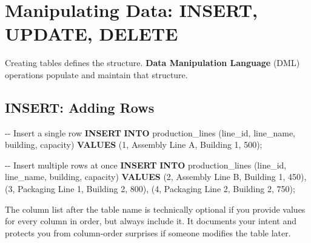 \documentclass[
  letterpaper,
  DIV=11,
  numbers=noendperiod]{scrreprt}
\newenvironment{Shaded}{\begin{snugshade}}{\end{snugshade}}
\newcommand{\CommentTok}[1]{\textcolor[rgb]{0.37,0.37,0.37}{#1}}
\newcommand{\DecValTok}[1]{\textcolor[rgb]{0.68,0.00,0.00}{#1}}
\newcommand{\KeywordTok}[1]{\textcolor[rgb]{0.00,0.23,0.31}{\textbf{#1}}}
\newcommand{\NormalTok}[1]{\textcolor[rgb]{0.00,0.23,0.31}{#1}}
\newcommand{\StringTok}[1]{\textcolor[rgb]{0.13,0.47,0.30}{#1}}
\begin{document}
\section{Manipulating Data: INSERT, UPDATE,
DELETE}\label{manipulating-data-insert-update-delete}

Creating tables defines the structure. \textbf{Data Manipulation
Language} (DML) operations populate and maintain that structure.

\subsection{INSERT: Adding Rows}\label{insert-adding-rows}

\begin{codelisting}

\caption{\texttt{duckdb}}

\begin{Shaded}
\begin{Highlighting}[]
\CommentTok{{-}{-} Insert a single row}
\KeywordTok{INSERT} \KeywordTok{INTO}\NormalTok{ production\_lines (line\_id, line\_name, building, capacity)}
\KeywordTok{VALUES}\NormalTok{ (}\DecValTok{1}\NormalTok{, }\StringTok{\textquotesingle{}Assembly Line A\textquotesingle{}}\NormalTok{, }\StringTok{\textquotesingle{}Building 1\textquotesingle{}}\NormalTok{, }\DecValTok{500}\NormalTok{);}

\CommentTok{{-}{-} Insert multiple rows at once}
\KeywordTok{INSERT} \KeywordTok{INTO}\NormalTok{ production\_lines (line\_id, line\_name, building, capacity)}
\KeywordTok{VALUES}
\NormalTok{    (}\DecValTok{2}\NormalTok{, }\StringTok{\textquotesingle{}Assembly Line B\textquotesingle{}}\NormalTok{, }\StringTok{\textquotesingle{}Building 1\textquotesingle{}}\NormalTok{, }\DecValTok{450}\NormalTok{),}
\NormalTok{    (}\DecValTok{3}\NormalTok{, }\StringTok{\textquotesingle{}Packaging Line 1\textquotesingle{}}\NormalTok{, }\StringTok{\textquotesingle{}Building 2\textquotesingle{}}\NormalTok{, }\DecValTok{800}\NormalTok{),}
\NormalTok{    (}\DecValTok{4}\NormalTok{, }\StringTok{\textquotesingle{}Packaging Line 2\textquotesingle{}}\NormalTok{, }\StringTok{\textquotesingle{}Building 2\textquotesingle{}}\NormalTok{, }\DecValTok{750}\NormalTok{);}
\end{Highlighting}
\end{Shaded}

\end{codelisting}

The column list after the table name is technically optional if you
provide values for every column in order, but always include it. It
documents your intent and protects you from column-order surprises if
someone modifies the table later.
\end{document}
